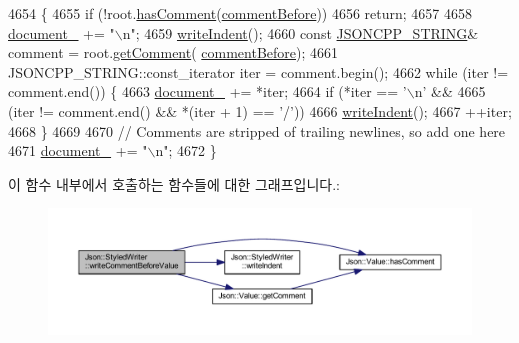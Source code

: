 \begin{DoxyCode}
4654                                                             \{
4655   \textcolor{keywordflow}{if} (!root.\hyperlink{class_json_1_1_value_a65d8e3ab6a5871cbd019a3e0f0b944a3}{hasComment}(\hyperlink{namespace_json_a4fc417c23905b2ae9e2c47d197a45351a52f1733775460517b2ea6bedf4906d52}{commentBefore}))
4656     \textcolor{keywordflow}{return};
4657 
4658   \hyperlink{class_json_1_1_styled_writer_ae967b0c77e4d7cb889ce7b6ee4ce28d7}{document\_} += \textcolor{stringliteral}{"\(\backslash\)n"};
4659   \hyperlink{class_json_1_1_styled_writer_a885f4bfb5701896d60eee6716d2db7e4}{writeIndent}();
4660   \textcolor{keyword}{const} \hyperlink{json-forwards_8h_a1e723f95759de062585bc4a8fd3fa4be}{JSONCPP\_STRING}& comment = root.\hyperlink{class_json_1_1_value_a82817229a986f0b254e31d5c83066ffe}{getComment}(
      \hyperlink{namespace_json_a4fc417c23905b2ae9e2c47d197a45351a52f1733775460517b2ea6bedf4906d52}{commentBefore});
4661   JSONCPP\_STRING::const\_iterator iter = comment.begin();
4662   \textcolor{keywordflow}{while} (iter != comment.end()) \{
4663     \hyperlink{class_json_1_1_styled_writer_ae967b0c77e4d7cb889ce7b6ee4ce28d7}{document\_} += *iter;
4664     \textcolor{keywordflow}{if} (*iter == \textcolor{charliteral}{'\(\backslash\)n'} &&
4665        (iter != comment.end() && *(iter + 1) == \textcolor{charliteral}{'/'}))
4666       \hyperlink{class_json_1_1_styled_writer_a885f4bfb5701896d60eee6716d2db7e4}{writeIndent}();
4667     ++iter;
4668   \}
4669 
4670   \textcolor{comment}{// Comments are stripped of trailing newlines, so add one here}
4671   \hyperlink{class_json_1_1_styled_writer_ae967b0c77e4d7cb889ce7b6ee4ce28d7}{document\_} += \textcolor{stringliteral}{"\(\backslash\)n"};
4672 \}
\end{DoxyCode}
이 함수 내부에서 호출하는 함수들에 대한 그래프입니다.\+:\nopagebreak
\begin{figure}[H]
\begin{center}
\leavevmode
\includegraphics[width=350pt]{class_json_1_1_styled_writer_ad3452c48fabf968bf3693549331ec06e_cgraph}
\end{center}
\end{figure}
